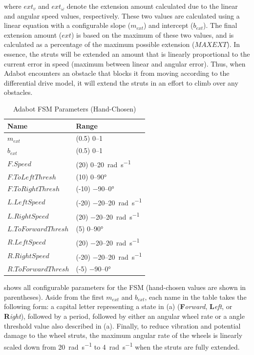 \noindent
where $\mathit{ext}_v$ and $\mathit{ext}_\omega$ denote the extension amount calculated due to the linear and angular speed values, respectively. These two values are calculated using a linear equation with a configurable slope ($m_{\mathit{ext}}$) and intercept ($b_{\mathit{ext}}$).
%
The final extension amount ($\mathit{ext}$) is based on the maximum of these two values, and is calculated as a percentage of the maximum possible extension ($\mathit{MAXEXT}$).
%
In essence, the struts will be extended an amount that is linearly proportional to the current error in speed (maximum between linear and angular error).
%
Thus, when Adabot encounters an obstacle that blocks it from moving according to the differential drive model, it will extend the struts in an effort to climb over any obstacles.


\begin{table}[thb]
    \centering
    \caption{Adabot FSM Parameters (Hand-Chosen)}
    \label{tbl:params-fsm}
    \begin{tabular}{@{}ll@{}}
        \toprule
        \textbf{Name} & \textbf{Range}\\
        \midrule
        $m_{\mathit{ext}}$ & (0.5) \numrange{0}{1}\\
        $b_{\mathit{ext}}$ & (0.5) \numrange{0}{1}\\
        $F.Speed$ & (20) \numrange{0}{20}~\si{\radian\per\second} \\
        $F.ToLeftThresh$ & (10) \numrange{0}{90}\si{\degree}\\
        $F.ToRightThresh$ & (-10) \numrange{-90}{0}\si{\degree}\\
        $L.LeftSpeed$ & (-20) \numrange{-20}{20}~\si{\radian\per\second} \\
        $L.RightSpeed$ & (20) \numrange{-20}{20}~\si{\radian\per\second} \\
        $L.ToForwardThresh$ & (5) \numrange{0}{90}\si{\degree}\\
        $R.LeftSpeed$ & (20) \numrange{-20}{20}~\si{\radian\per\second} \\
        $R.RightSpeed$ & (-20) \numrange{-20}{20}~\si{\radian\per\second} \\
        $R.ToForwardThresh$ & (-5) \numrange{-90}{0}\si{\degree}\\
        \bottomrule
    \end{tabular}
\vspace{-0.2in}
\end{table}


%
 shows all configurable parameters for the FSM (hand-chosen values are shown in parentheses).
%
Aside from the first $m_{\mathit{ext}}$ and $b_{\mathit{ext}}$, each name in the table takes the following form: a capital letter representing a state in (a) (\textbf{F}\emph{orward}, \textbf{L}\emph{eft}, or \textbf{R}\emph{ight}), followed by a period, followed by either an angular wheel rate or a angle threshold value also described in (a).
%
Finally, to reduce vibration and potential damage to the wheel struts, the maximum angular rate of the wheels is linearly scaled down from 20~\si{\radian\per\second} to 4~\si{\radian\per\second} when the struts are fully extended.

